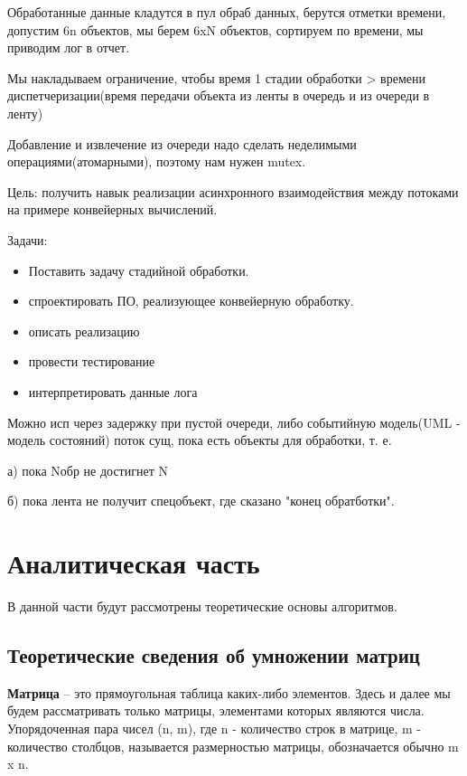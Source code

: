 \documentclass[a4paper, 14pt]{article}
\begin{document}
 		Обработанные данные кладутся в пул обраб данных, берутся отметки времени, допустим 6n объектов, мы берем 6xN объектов, сортируем по времени, мы приводим лог в отчет. 
 		
 		Мы накладываем ограничение, чтобы время 1 стадии обработки > времени диспетчеризации(время передачи объекта из ленты в очередь и из очереди в ленту)
 		
 		Добавление и извлечение из очереди надо сделать неделимыми операциями(атомарными), поэтому нам нужен mutex.
 		
 		Цель: получить навык реализации асинхронного взаимодействия между потоками на примере конвейерных вычислений.



		Задачи:
		\begin{itemize} 		
 		\item Поставить задачу стадийной обработки.
 		\item спроектировать ПО, реализующее конвейерную обработку.
 		\item описать реализацию
 		\item провести тестирование
 		\item интерпретировать данные лога
		\end{itemize}
		Можно исп через задержку при пустой очереди, либо событийную модель(UML - модель состояний)
		поток сущ, пока есть объекты для обработки, т. е.
		
		а) пока Nобр не достигнет N
		
		б) пока лента не получит спецобъект, где сказано "конец обратботки". 
        \label{sec:intro}

    	\newpage
        \section{Аналитическая часть}
		\parindent=1cm
		
		В данной части будут рассмотрены теоретические основы алгоритмов.
		

        \subsection{Теоретические сведения об умножении матриц}
        
		\textbf{Матрица} – это прямоугольная таблица каких-либо элементов. Здесь и далее мы будем рассматривать только матрицы, элементами которых являются числа. Упорядоченная пара чисел (n, m), где n - количество строк в матрице, m - количество столбцов, называется размерностью матрицы, обозначается обычно m x n\cite{Beloysov}.
		
\end{document}

